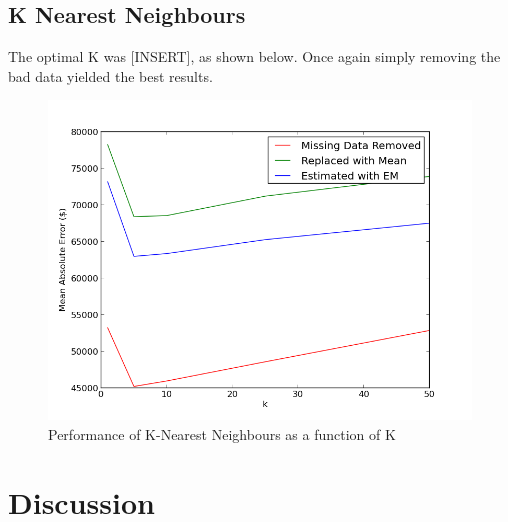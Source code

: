 \documentclass{acm_proc_article-sp}
\begin{document}
\subsection{K Nearest Neighbours}
	The optimal K was [INSERT], as shown below. Once again simply removing the bad data yielded the best results. 
	
	\begin{figure}[H]
   		\centering
  		\includegraphics[width=\linewidth]{knn_tuning.png}
    		\caption{Performance of K-Nearest Neighbours as a function of K}
    		\label{fig:knn}
	\end{figure}


\section{Discussion}
\end{document}
